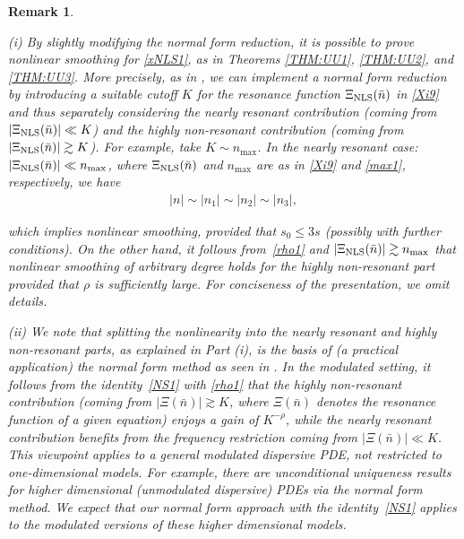 \documentclass[letterpaper, 11pt,  reqno]{amsart}
\newtheorem{remark}[theorem]{Remark}
\newcommand{\1}{\hspace{0.5mm}\text{I}\hspace{0.5mm}}
\newcommand{\noi}{\noindent}
\newcommand{\ges}{\gtrsim}
\newcommand{\NLS}{\text{\rm NLS} }
\numberwithin{equation}{section}
\numberwithin{theorem}{section}
\begin{document}
\begin{remark} \label{REM:NLS1}\rm

(i)
By slightly modifying the normal form reduction, 
 it is possible to prove nonlinear smoothing 
for \eqref{xNLS1},
as in Theorems \ref{THM:UU1}, \ref{THM:UU2}, and \ref{THM:UU3}.
More precisely, 
as  in 
\cite{GKO, OW}, 
we can implement a normal form reduction
by introducing a suitable cutoff $K$ for the resonance function $\Xi_{\NLS}(\bar n)$ in \eqref{Xi9}
and thus separately considering
the {\it nearly resonant} contribution 
(coming from $|\Xi_{\NLS}(\bar n)|\ll K$)
and the {\it highly
non-resonant} contribution
(coming from $|\Xi_{\NLS}(\bar n)|\ges K$).
For example, take $K \sim n_{\max}$.
In  the nearly resonant case: $|\Xi_\NLS(\bar n)| \ll n_{\max}$, 
where 
$\Xi_\NLS(\bar n)$ and 
$n_{\max}$ are as in 
\eqref{Xi9} and \eqref{max1}, respectively, 
we have
\begin{align*}
 |n|\sim |n_1|\sim|n_2|\sim|n_3|,
\end{align*}

\noi
which implies nonlinear smoothing, 
provided that $s_0 \le 3s$
(possibly with further conditions).
On the other hand, 
it follows from~\eqref{rho1} 
and $|\Xi_\NLS(\bar n)| \ges  n_{\max}$
that  nonlinear smoothing of arbitrary degree
holds 
for the highly non-resonant part
provided that $\rho$ is sufficiently large.
For conciseness of the presentation, we omit details.


\medskip

\noi
(ii) 
We note that splitting the nonlinearity
into the nearly resonant and highly non-resonant parts, 
as explained in Part (i), 
is the basis of (a practical application) the normal form method
as seen in \cite{GKO, OW}.
In the modulated setting, 
it follows from  the identity~\eqref{NS1} with 
\eqref{rho1}
that 
the  highly
non-resonant contribution
(coming from $|\Xi(\bar n)|\ges K$, 
where $\Xi(\bar n)$ denotes the resonance function of a given equation)
enjoys a gain of $K^{-\rho}$, 
while the nearly resonant contribution
benefits from the frequency restriction coming from 
$|\Xi(\bar n)|\ll K$.
This viewpoint applies to a general modulated dispersive PDE, not restricted to one-dimensional models.
For example, 
there are unconditional uniqueness results 
\cite{Kishi21, BOW} 
for higher dimensional (unmodulated dispersive) PDEs
 via the normal form method.
We expect that 
our normal form approach 
with the identity~\eqref{NS1}
applies to 
the modulated versions of these 
higher dimensional models. 





\end{remark}
\end{document}
